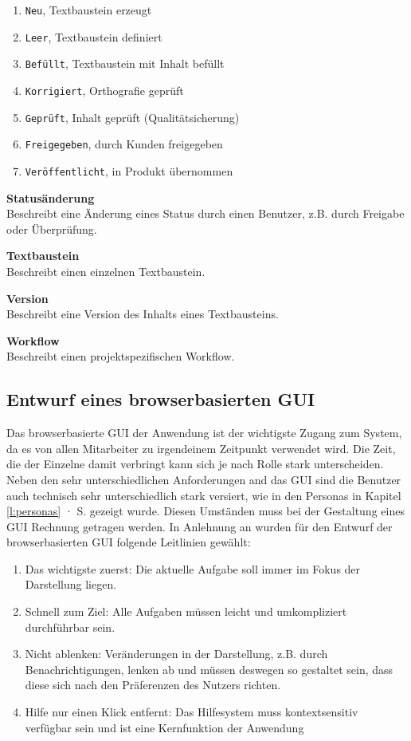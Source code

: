 \begin{enumerate}\itemsep -5pt
\item \texttt{Neu}, Textbaustein erzeugt
\item \texttt{Leer}, Textbaustein definiert
\item \texttt{Befüllt}, Textbaustein mit Inhalt befüllt
\item \texttt{Korrigiert}, Orthografie geprüft
\item \texttt{Geprüft}, Inhalt geprüft (Qualitätsicherung)
\item \texttt{Freigegeben}, durch Kunden freigegeben
\item \texttt{Veröffentlicht}, in Produkt übernommen
\end{enumerate}

\textsf{\textbf{Statusänderung}}\\Beschreibt eine Änderung eines Status durch einen Benutzer, z.B. durch Freigabe oder Überprüfung.

\textsf{\textbf{Textbaustein}}\\Beschreibt einen einzelnen Textbaustein.

\textsf{\textbf{Version}}\\Beschreibt eine Version des Inhalts eines Textbausteins.

\textsf{\textbf{Workflow}}\\Beschreibt einen projektspezifischen Workflow.

\pagebreak

\subsection{Entwurf eines browserbasierten GUI}\label{l:entwurf-gui}

Das browserbasierte GUI der Anwendung ist der wichtigste Zugang zum System, da es von allen Mitarbeiter zu irgendeinem Zeitpunkt verwendet wird. Die Zeit, die der Einzelne damit verbringt kann sich je nach Rolle stark unterscheiden. Neben den sehr unterschiedlichen Anforderungen and das GUI sind die Benutzer auch technisch sehr unterschiedlich stark versiert, wie in den Personas in Kapitel \ref{l:personas} · S.\pageref{l:personas} gezeigt wurde. Diesen Umständen muss bei der Gestaltung eines GUI Rechnung getragen werden. In Anlehnung an \cite{nielsen} wurden für den Entwurf der browserbasierten GUI folgende Leitlinien gewählt:

\begin{enumerate}\itemsep -5pt
\item{Das wichtigste zuerst: Die aktuelle Aufgabe soll immer im Fokus der Darstellung liegen.}
\item{Schnell zum Ziel: Alle Aufgaben müssen leicht und umkompliziert durchführbar sein.}
\item{Nicht ablenken: Veränderungen in der Darstellung, z.B. durch Benachrichtigungen, lenken ab und müssen deswegen so gestaltet sein, dass diese sich nach den Präferenzen des Nutzers richten.}
\item{Hilfe nur einen Klick entfernt: Das Hilfesystem muss kontextsensitiv verfügbar sein und ist eine Kernfunktion der Anwendung}
\end{enumerate}

